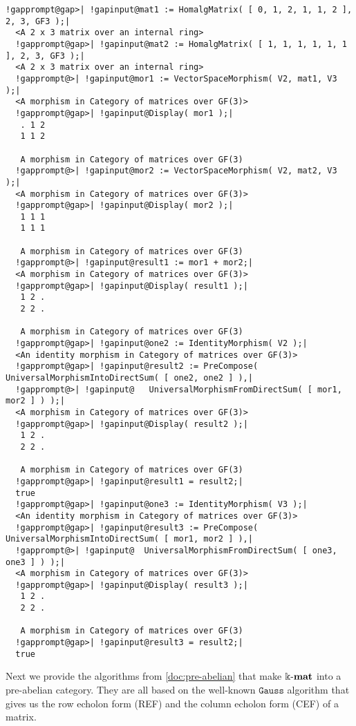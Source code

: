 \begin{computation}
\begin{Verbatim}[commandchars=!@|,fontsize=\small,frame=single,label=Example]
  !gapprompt@gap>| !gapinput@mat1 := HomalgMatrix( [ 0, 1, 2, 1, 1, 2 ], 2, 3, GF3 );|
  <A 2 x 3 matrix over an internal ring>
  !gapprompt@gap>| !gapinput@mat2 := HomalgMatrix( [ 1, 1, 1, 1, 1, 1 ], 2, 3, GF3 );|
  <A 2 x 3 matrix over an internal ring>
  !gapprompt@>| !gapinput@mor1 := VectorSpaceMorphism( V2, mat1, V3 );|
  <A morphism in Category of matrices over GF(3)>
  !gapprompt@gap>| !gapinput@Display( mor1 );|
   . 1 2
   1 1 2
   
   A morphism in Category of matrices over GF(3)
  !gapprompt@>| !gapinput@mor2 := VectorSpaceMorphism( V2, mat2, V3 );|
  <A morphism in Category of matrices over GF(3)>
  !gapprompt@gap>| !gapinput@Display( mor2 );|
   1 1 1
   1 1 1
   
   A morphism in Category of matrices over GF(3)
  !gapprompt@>| !gapinput@result1 := mor1 + mor2;|
  <A morphism in Category of matrices over GF(3)>
  !gapprompt@gap>| !gapinput@Display( result1 );|
   1 2 .
   2 2 .
   
   A morphism in Category of matrices over GF(3)
  !gapprompt@gap>| !gapinput@one2 := IdentityMorphism( V2 );|
  <An identity morphism in Category of matrices over GF(3)>
  !gapprompt@gap>| !gapinput@result2 := PreCompose( UniversalMorphismIntoDirectSum( [ one2, one2 ] ),|
  !gapprompt@>| !gapinput@   UniversalMorphismFromDirectSum( [ mor1, mor2 ] ) );|
  <A morphism in Category of matrices over GF(3)>
  !gapprompt@gap>| !gapinput@Display( result2 );|
   1 2 .
   2 2 .
   
   A morphism in Category of matrices over GF(3)
  !gapprompt@gap>| !gapinput@result1 = result2;|
  true
  !gapprompt@gap>| !gapinput@one3 := IdentityMorphism( V3 );|
  <An identity morphism in Category of matrices over GF(3)>
  !gapprompt@gap>| !gapinput@result3 := PreCompose( UniversalMorphismIntoDirectSum( [ mor1, mor2 ] ),|
  !gapprompt@>| !gapinput@  UniversalMorphismFromDirectSum( [ one3, one3 ] ) );|
  <A morphism in Category of matrices over GF(3)>
  !gapprompt@gap>| !gapinput@Display( result3 );|
   1 2 .
   2 2 .
   
   A morphism in Category of matrices over GF(3)
  !gapprompt@gap>| !gapinput@result3 = result2;|
  true
\end{Verbatim}
\end{computation}

Next we provide the algorithms from \ref{doc:pre-abelian} that make $\Bbbk\textnormal{-}\mathbf{mat}$ into a pre-abelian category.
They are all based on the well-known $\mathtt{Gauss}$ algorithm that gives us the row echolon form (REF) and
the column echolon form (CEF) of a matrix.

